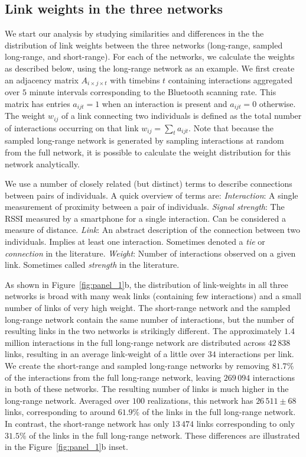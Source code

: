 \documentclass[fleqn,10pt]{wlscirep}
\begin{document}
\subsection*{Link weights in the three networks}
We start our analysis by studying similarities and differences in the the distribution of link weights between the three networks (long-range, sampled long-range, and short-range).
For each of the networks, we calculate the weights as described below, using the long-range network as an example. 
We first create an adjacency matrix $A_{i\times j\times t}$ with timebins $t$ containing interactions aggregated over $5$ minute intervals corresponding to the Bluetooth scanning rate.
This matrix has entries $a_{ijt} = 1$ when an interaction is present and $a_{ijt} = 0$ otherwise. 
The weight $w_{ij}$ of a link connecting two individuals is defined as the total number of interactions occurring on that link $w_{ij} = \sum_t{a_{ijt}}$.
Note that because the sampled long-range network is generated by sampling interactions at random from the full network, it is possible to calculate the weight distribution for this network analytically.


We use a number of closely related (but distinct) terms to describe connections between pairs of individuals. 
A quick overview of terms are:
\emph{Interaction}: A single measurement of proximity between a pair of individuals. 
\emph{Signal strength}: The RSSI measured by a smartphone for a single interaction. Can be considered a measure of distance. 
\emph{Link}: An abstract description of the connection between two individuals. Implies at least one interaction. Sometimes denoted a \emph{tie} or \emph{connection} in the literature. 
\emph{Weight}: Number of interactions observed on a given link. Sometimes called \emph{strength} in the literature.


As shown in Figure~\ref{fig:panel_1}b, the distribution of link-weights in all three networks is broad with many weak links (containing few interactions) and a small number of links of very high weight. 
The short-range network and the sampled long-range network contain the same number of interactions, but the number of resulting links in the two networks is strikingly different. 
The approximately $1.4$ million interactions in the full long-range network are distributed across $42\,838$ links, resulting in an average link-weight of a little over $34$ interactions per link.
We create the short-range and sampled long-range networks by removing $81.7\%$ of the interactions from the full long-range network, leaving $269\,094$ interactions in both of these networks. 
The resulting number of links is much higher in the long-range network.
Averaged over $100$ realizations, this network has $26\,511\pm 68$ links, corresponding to around $61.9\%$ of the links in the full long-range network.
In contrast, the short-range network has only $13\,474$ links corresponding to only $31.5\%$ of the links in the full long-range network.
These differences are illustrated in the Figure~\ref{fig:panel_1}b inset.
\end{document}

